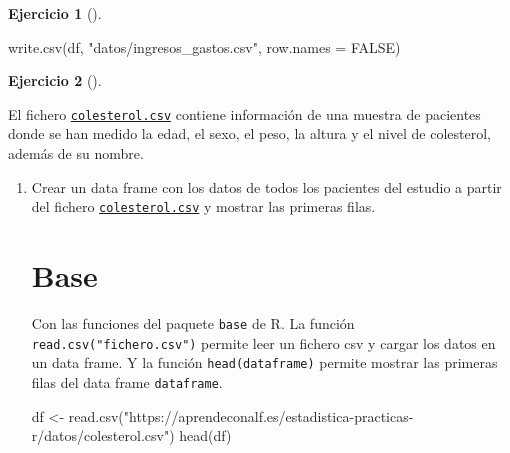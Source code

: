 \documentclass[
  spanish,
  a4paper,
]{scrreport}
\newenvironment{Shaded}{\begin{snugshade}}{\end{snugshade}}
\newcommand{\AttributeTok}[1]{\textcolor[rgb]{0.40,0.45,0.13}{#1}}
\newcommand{\ConstantTok}[1]{\textcolor[rgb]{0.56,0.35,0.01}{#1}}
\newcommand{\FunctionTok}[1]{\textcolor[rgb]{0.28,0.35,0.67}{#1}}
\newcommand{\NormalTok}[1]{\textcolor[rgb]{0.00,0.23,0.31}{#1}}
\newcommand{\OtherTok}[1]{\textcolor[rgb]{0.00,0.23,0.31}{#1}}
\newcommand{\StringTok}[1]{\textcolor[rgb]{0.13,0.47,0.30}{#1}}
\theoremstyle{definition}
\newtheorem{exercise}{Ejercicio}[chapter]
\theoremstyle{remark}
\begin{document}
\begin{exercise}[]
\begin{enumerate}
\begin{tcolorbox}
\begin{Shaded}
\begin{Highlighting}[]
\FunctionTok{write.csv}\NormalTok{(df, }\StringTok{"datos/ingresos\_gastos.csv"}\NormalTok{, }\AttributeTok{row.names =} \ConstantTok{FALSE}\NormalTok{)}
\end{Highlighting}
\end{Shaded}

  \end{tcolorbox}
\end{enumerate}

\end{exercise}

\begin{exercise}[]\protect\hypertarget{exr-dataframes-2}{}\label{exr-dataframes-2}

El fichero \href{datos/colesterol.csv}{\texttt{colesterol.csv}} contiene
información de una muestra de pacientes donde se han medido la edad, el
sexo, el peso, la altura y el nivel de colesterol, además de su nombre.

\begin{enumerate}
\def\labelenumi{\alph{enumi}.}
\item
  Crear un data frame con los datos de todos los pacientes del estudio a
  partir del fichero
  \href{datos/colesterol.csv}{\texttt{colesterol.csv}} y mostrar las
  primeras filas.

  \begin{tcolorbox}[enhanced jigsaw, titlerule=0mm, arc=.35mm, rightrule=.15mm, opacitybacktitle=0.6, leftrule=.75mm, colframe=quarto-callout-tip-color-frame, toptitle=1mm, breakable, colbacktitle=quarto-callout-tip-color!10!white, bottomrule=.15mm, colback=white, left=2mm, bottomtitle=1mm, opacityback=0, title=\textcolor{quarto-callout-tip-color}{\faLightbulb}\hspace{0.5em}{Solución}, toprule=.15mm, coltitle=black]

  \section{Base}

  Con las funciones del paquete \texttt{base} de R. La función
  \texttt{read.csv("fichero.csv")} permite leer un fichero csv y cargar
  los datos en un data frame. Y la función \texttt{head(dataframe)}
  permite mostrar las primeras filas del data frame \texttt{dataframe}.

\begin{Shaded}
\begin{Highlighting}[]
\NormalTok{df }\OtherTok{\textless{}{-}} \FunctionTok{read.csv}\NormalTok{(}\StringTok{"https://aprendeconalf.es/estadistica{-}practicas{-}r/datos/colesterol.csv"}\NormalTok{)}
\FunctionTok{head}\NormalTok{(df)}
\end{Highlighting}
\end{Shaded}


\end{tcolorbox}
\end{enumerate}
\end{exercise}
\end{document}
